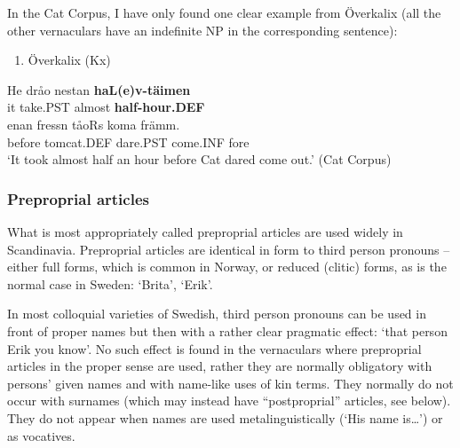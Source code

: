 In the Cat Corpus, I have only found one clear example from Överkalix (all the other vernaculars have an indefinite NP in the corresponding sentence):


\begin{enumerate} %
\item 
Överkalix (Kx) 

\end{enumerate} %
\ea\label{}
\gll He  dråo  nestan  \textbf{haL(e)v-täimen}\\


it  take.PST  almost  \textbf{half-hour.DEF}\\ %


\ea\label{}
\gll enan  fressn  tåoRs  koma  främm.\\


before  tomcat.DEF  dare.PST  come.INF  fore\\ %


‘It took almost half an hour before Cat dared come out.’ (Cat Corpus)
\z


\subsubsection[Preproprial articles]{\rmfamily Preproprial articles}
\label{bkm:Ref224379496}%
What is most appropriately called preproprial articles are used widely in Scandinavia. Preproprial articles are identical in form to third person pronouns – either full forms, which is common in Norway, or reduced (clitic) forms, as is the normal case in Sweden:  ‘Brita’, ‘Erik’. 

In most colloquial varieties of Swedish, third person pronouns can be used in front of proper names but then with a rather clear pragmatic effect:  ‘that person Erik you know’. No such effect is found in the vernaculars where preproprial articles in the proper sense are used, rather they are normally obligatory with persons’ given names and with name-like uses of kin terms. They normally do not occur with surnames (which may instead have “postproprial” articles, see below). They do not appear when names are used metalinguistically (‘His name is…’) or as vocatives. 

